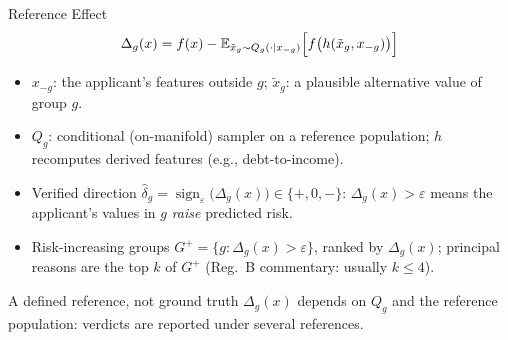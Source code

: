 \documentclass[aspectratio=169,10pt]{beamer}
\begin{document}
\begin{frame}{Reference Effect}
  \[\Delta_g(x)=f(x)-\mathbb{E}_{\tilde x_g\sim Q_g(\cdot\mid x_{-g})}\Bigl[f\bigl(h(\tilde x_g,x_{-g})\bigr)\Bigr]\]
  \begin{itemize}\footnotesize
    \setlength{\itemsep}{0.9ex}
    \item[\textbullet] $x_{-g}$: the applicant's features outside $g$; $\tilde x_g$: a plausible alternative value of group $g$.
    \item[\textbullet] $Q_g$: conditional (on-manifold) sampler on a reference population; $h$ recomputes derived features (e.g., debt-to-income).
    \item[\textbullet] Verified direction $\widehat{\delta}_g=\operatorname{sign}_\varepsilon\bigl(\Delta_g(x)\bigr)\in\{+,0,-\}$: $\Delta_g(x)>\varepsilon$ means the applicant's values in $g$ \emph{raise} predicted risk.
    \item[\textbullet] Risk-increasing groups $G^+=\{g:\Delta_g(x)>\varepsilon\}$, ranked by $\Delta_g(x)$; principal reasons are the top $k$ of $G^+$ (Reg.\ B commentary: usually $k\le 4$).
  \end{itemize}
  \vspace{0.5ex}
  \begin{block}{A defined reference, not ground truth}
    $\Delta_g(x)$ depends on $Q_g$ and the reference population: verdicts are reported under several references.
  \end{block}
\end{frame}
\end{document}
